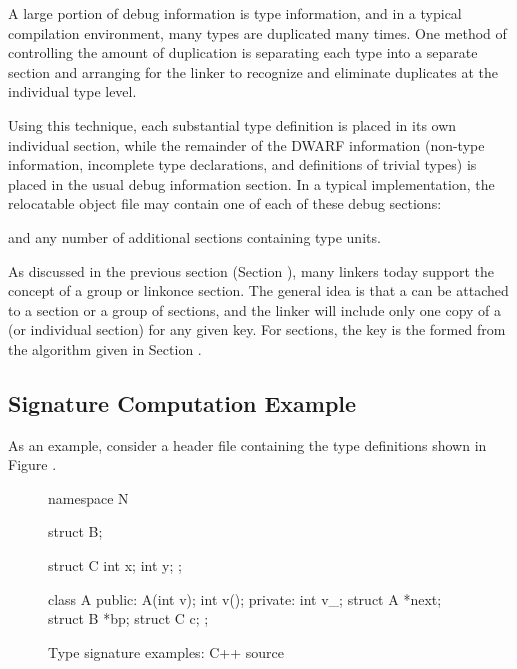 A large portion of debug information is type information, and
in a typical compilation environment, many types are duplicated
many times. One method of controlling the amount of duplication
is separating each type into a separate 
\COMDAT{} \dotdebuginfo{} section
and arranging for the linker to recognize and eliminate
duplicates at the individual type level.

Using this technique, each substantial type definition is
placed in its own individual section, while the remainder
of the DWARF information (non-type information, incomplete
type declarations, and definitions of trivial types) is
placed in the usual debug information section. In a typical
implementation, the relocatable object file may contain one
of each of these debug sections:

\begin{alltt}
\dotdebugabbrev{}
\dotdebuginfo{}
\dotdebugline{}
\end{alltt}

and any number of additional \COMDAT{} \dotdebuginfo{} sections
containing type units.

As discussed in the previous section 
(Section ), 
many
linkers today support the concept of a \COMDAT{} group or
linkonce section. The general idea is that a  can be
attached to a section or a group of sections, and the linker
will include only one copy of a 
(or individual section) for any given key. 
For \COMDAT{} \dotdebuginfo{} sections, the
key is the 
formed from the algorithm given in
Section .

\subsection{Signature Computation Example}
\label{app:signaturecomputationexample}

As an example, 
consider a  header file 
containing the type definitions shown
in Figure .

\begin{figure}[ht]
\begin{nlnlisting}
namespace N {

    struct B;

    struct C {
        int x;
        int y;
    };

    class A {
    public:
        A(int v);
        int v();
    private:
        int v_;
        struct A *next;
        struct B *bp;
        struct C c;
    };
}
\end{nlnlisting}
\caption{Type signature examples: C++ source}
\label{fig:typesignatureexamplescsource}
\end{figure}

